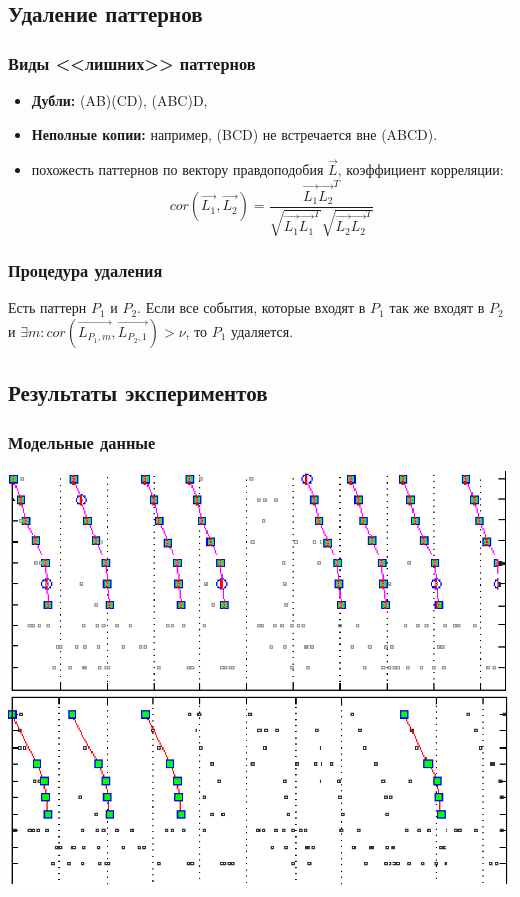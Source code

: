 \documentclass[smaller]{beamer}
\begin{document}
\subsection{Удаление паттернов}
\begin{frame}
  \frametitle{Виды <<лишних>> паттернов}
  \begin{itemize}
   \item {\bf Дубли:} (AB)(CD), (ABC)D,
   \item {\bf Неполные копии:} например, (BCD) не встречается вне (ABCD).
   \item похожесть паттернов по вектору правдоподобия $\overrightarrow{L}$, коэффициент корреляции:
   $$cor(\overrightarrow{L_1}, \overrightarrow{L_2}) = \frac{\overrightarrow{L_1}\overrightarrow{L_2}^T}{\sqrt{\overrightarrow{L_1}\overrightarrow{L_1}^T}\sqrt{\overrightarrow{L_2}\overrightarrow{L_2}^T}}$$
   \end{itemize}
\end{frame}

\begin{frame}
  \frametitle{Процедура удаления}
  
  Есть паттерн $P_1$ и $P_2$.
  Если все события, которые входят в $P_1$ так же 
  входят в $P_2$ и  $\exists m: cor(\overrightarrow{L_{P_1,m}}, \overrightarrow{L_{P_2,1}}) > \nu$, то  
  $P_1$ удаляется.
   
   
\end{frame}


\subsection{Результаты экспериментов}
\begin{frame}
  \frametitle{Модельные данные}
  
        \includegraphics[scale=0.6]{comp.eps}

\end{frame}
\end{document}
